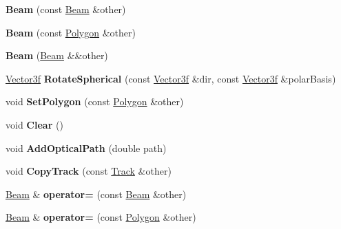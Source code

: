 \begin{DoxyCompactItemize}
\item 
\mbox{\label{class_beam_adbc5396fffb1ace9dc8cd19c4fdc88cd}} 
{\bfseries Beam} (const \mbox{\hyperlink{class_beam}{Beam}} \&other)
\item 
\mbox{\label{class_beam_a05e068b4ebc57f440e097c4a63317265}} 
{\bfseries Beam} (const \mbox{\hyperlink{class_polygon}{Polygon}} \&other)
\item 
\mbox{\label{class_beam_a6341eed626313828398def11cbf3b509}} 
{\bfseries Beam} (\mbox{\hyperlink{class_beam}{Beam}} \&\&other)
\item 
\mbox{\label{class_beam_ab69efe43df201ea6baf20edb61e46da7}} 
\mbox{\hyperlink{struct_point3f}{Vector3f}} {\bfseries Rotate\+Spherical} (const \mbox{\hyperlink{struct_point3f}{Vector3f}} \&dir, const \mbox{\hyperlink{struct_point3f}{Vector3f}} \&polar\+Basis)
\item 
\mbox{\label{class_beam_a1d64711b13ffc63640f88a8134d74635}} 
void {\bfseries Set\+Polygon} (const \mbox{\hyperlink{class_polygon}{Polygon}} \&other)
\item 
\mbox{\label{class_beam_a9b3e47e4c2f90f1c8f779ef76a19ea04}} 
void {\bfseries Clear} ()
\item 
\mbox{\label{class_beam_a99651f25bb8382a0fefb45a36f6654de}} 
void {\bfseries Add\+Optical\+Path} (double path)
\item 
\mbox{\label{class_beam_af7f8a41463c9fc4d610f26b747459400}} 
void {\bfseries Copy\+Track} (const \mbox{\hyperlink{class_track}{Track}} \&other)
\item 
\mbox{\label{class_beam_a997934d2767596c43a639d56329b96f7}} 
\mbox{\hyperlink{class_beam}{Beam}} \& {\bfseries operator=} (const \mbox{\hyperlink{class_beam}{Beam}} \&other)
\item 
\mbox{\label{class_beam_a7209c2c0a466af4d5a86949162c102cc}} 
\mbox{\hyperlink{class_beam}{Beam}} \& {\bfseries operator=} (const \mbox{\hyperlink{class_polygon}{Polygon}} \&other)

\end{DoxyCompactItemize}

